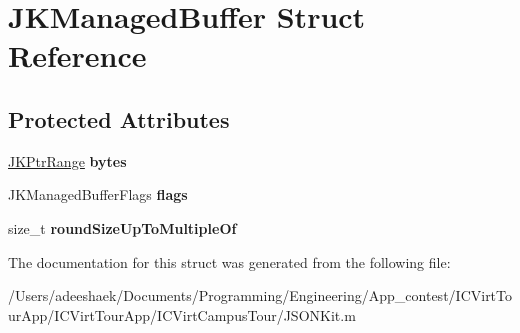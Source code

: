 \hypertarget{struct_j_k_managed_buffer}{\section{J\-K\-Managed\-Buffer Struct Reference}
\label{struct_j_k_managed_buffer}
}
\subsection*{Protected Attributes}
\begin{DoxyCompactItemize}
\item 
\hypertarget{struct_j_k_managed_buffer_a1bcbb622829922c149b26f454912a746}{\hyperlink{struct_j_k_ptr_range}{J\-K\-Ptr\-Range} {\bfseries bytes}}\label{struct_j_k_managed_buffer_a1bcbb622829922c149b26f454912a746}

\item 
\hypertarget{struct_j_k_managed_buffer_a9afa1e2bdb07027080bce4a35a19d0a7}{J\-K\-Managed\-Buffer\-Flags {\bfseries flags}}\label{struct_j_k_managed_buffer_a9afa1e2bdb07027080bce4a35a19d0a7}

\item 
\hypertarget{struct_j_k_managed_buffer_a931b05c6b4b87888d703d424e4595b15}{size\-\_\-t {\bfseries round\-Size\-Up\-To\-Multiple\-Of}}\label{struct_j_k_managed_buffer_a931b05c6b4b87888d703d424e4595b15}

\end{DoxyCompactItemize}


The documentation for this struct was generated from the following file\-:\begin{DoxyCompactItemize}
\item 
/\-Users/adeeshaek/\-Documents/\-Programming/\-Engineering/\-App\-\_\-contest/\-I\-C\-Virt\-Tour\-App/\-I\-C\-Virt\-Tour\-App/\-I\-C\-Virt\-Campus\-Tour/J\-S\-O\-N\-Kit.\-m\end{DoxyCompactItemize}
